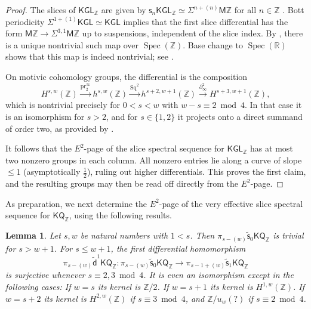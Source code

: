 \documentclass[11pt,hyp,english]{article}
\newcommand{\Z}{\mathbb{Z}}
\newcommand{\KGL}{\mathsf{KGL}}
\newcommand{\KQ}{\mathsf{KQ}}
\newcommand{\HZ}{\mathsf{M}\Z}
\newcommand{\R}{\mathbb{R}}
\newcommand{\Spec}{\operatorname{Spec}}
\newcommand{\Sq}{\operatorname{Sq}}
\newcommand{\pr}{\operatorname{pr}}
\newcommand{\s}{\mathsf{s}}
\newcommand{\vs}{\tilde{\mathsf{s}}}
\newcommand{\vd}{{\tilde{\mathsf{d}}}}
\newtheorem{lemma}[theorem]{Lemma}
\theoremstyle{definition}
\begin{document}
\begin{proof}
 The slices of $\KGL_\Z$ are given by $\s_n\KGL_\Z \simeq \Sigma^{n+(n)}\HZ$ for all $n\in \Z$ \cite{levine.homotopy-coniveau,bachmann.jems,bem.kglslices}.  
Bott periodicity $\Sigma^{1+(1)}\KGL\simeq \KGL$ implies that the first slice differential has the form $\HZ\to \Sigma^{3,1}\HZ$ up to suspensions, independent of the slice index.  
By , there is a unique nontrivial such map over $\Spec(\Z)$.  
Base change to $\Spec(\R)$ shows that this map is indeed nontrivial; see \cite{RO:slices}.  

On motivic cohomology groups, the differential is the composition  
\[
H^{s,w}(\Z)\xrightarrow{\pr^\infty_2}h^{s,w}(\Z)\xrightarrow{\Sq^2}h^{s+2,w+1}(\Z)\xrightarrow{\partial^2_\infty}H^{s+3,w+1}(\Z),
\]
which is nontrivial precisely for $0<s<w$ with $w-s\equiv 2\bmod 4$.  
In that case it is an isomorphism for $s>2$, and for $s\in\{1,2\}$ it projects onto a direct summand of order two, as provided by .  

It follows that the $E^2$-page of the slice spectral sequence for $\KGL_\Z$ has at most two nonzero groups in each column.  
All nonzero entries lie along a curve of slope $\leq 1$ (asymptotically $\tfrac{1}{2}$), ruling out higher differentials.  
This proves the first claim, and the resulting groups may then be read off directly from the $E^2$-page.
\end{proof}

As preparation, we next determine the $E^2$-page of the very effective slice spectral sequence for $\KQ_\Z$, using the following results.

\begin{lemma}\label{lem:vd1-iso}
Let $s,w$ be natural numbers with $1<s$. 
Then $\pi_{s-(w)}\vs_0\KQ_\Z$ is trivial for $s> w+1$.
For $s\leq w+1$, the first differential homomorphism 
\[ \pi_{s-(w)}\vd^1\KQ_\Z\colon \pi_{s-(w)}\vs_0\KQ_\Z \to \pi_{s-1+(w)}\vs_1\KQ_\Z\]
is surjective whenever $s\equiv 2,3 \bmod 4$.
It is even an isomorphism except in the following cases:
If $w=s$ its kernel is $\Z/2$.
If $w=s+1$ its kernel is $H^{1,w}(\Z)$.
If $w=s+2$ its kernel is $H^{2,w}(\Z)$ if $s\equiv 3 \bmod 4$, and $\Z/u_w(?)$ if $s\equiv 2 \bmod 4$.
\end{lemma}
\end{document}
